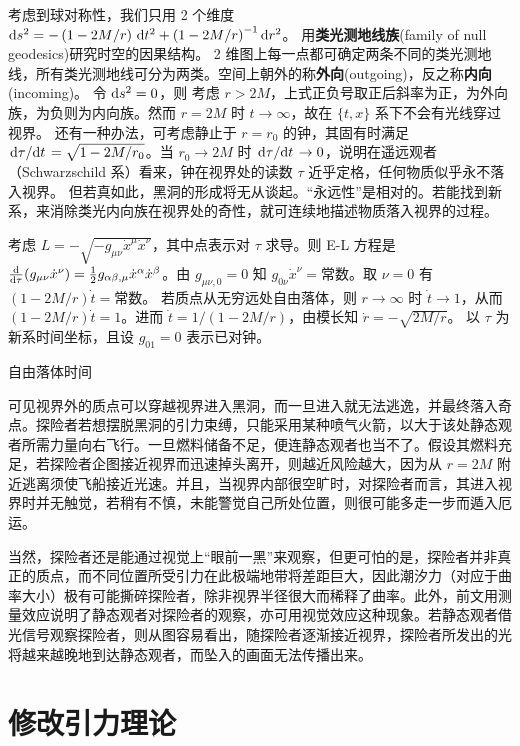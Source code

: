 考虑到球对称性，我们只用 2 个维度 $\dd s^2=-\left(1-{2M}/{r}\right)\,\text d t^2+\left(1-{2M}/{r}\right)^{-1}\text d r^2$。
用\textbf{类光测地线族}(family of null geodesics)研究时空的因果结构。
2 维图上每一点都可确定两条不同的类光测地线，所有类光测地线可分为两类。空间上朝外的称\textbf{外向}(outgoing)，反之称\textbf{内向}(incoming)。
令 $\dd s^2=0$，则
考虑 $r>2M$，上式正负号取正后斜率为正，为外向族，为负则为内向族。然而 $r=2M$ 时 $t\to\infty$，故在 $\{t,x\}$ 系下不会有光线穿过视界。
还有一种办法，可考虑静止于 $r=r_0$ 的钟，其固有时满足 $\dv*{\tau}{t}={\sqrt{1-2M/r_0}}$。当 $r_0\to 2M$ 时 $\dv*{\tau}{t}\to 0$，说明在遥远观者（Schwarzschild 系）看来，钟在视界处的读数 $\tau$ 近乎定格，任何物质似乎永不落入视界。
但若真如此，黑洞的形成将无从谈起。“永远性”是相对的。若能找到新系，来消除类光内向族在视界处的奇性，就可连续地描述物质落入视界的过程。

考虑 $L=-\sqrt{-g_{\mu\nu}\dot x^\mu\dot x^\nu}$，其中点表示对 $\tau$ 求导。则 E-L 方程是 $\dv{\tau}(g_{\mu\nu}\dot x^\nu)=\frac 12 g_{\alpha\beta,\mu}\dot x^\alpha\dot x^\beta$。由 $g_{\mu\nu,0}=0$ 知 $g_{0\nu}\dot x^\nu=\text{常数}$。取 $\nu=0$ 有 $\left(1-{2M}/{r}\right)\dot t=\text{常数}$。
若质点从无穷远处自由落体，则 $r\to\infty$ 时 $\dot t\to 1$，从而 $(1-{2M}/{r})\dot t=1$。进而 $\dot t=1/(1-{2M}/{r})$，由模长知 $\dot r=-\sqrt{2M/r}$。
以 $\tau$ 为新系时间坐标，且设 $g_{01} = 0$ 表示已对钟。

自由落体时间

可见视界外的质点可以穿越视界进入黑洞，而一旦进入就无法逃逸，并最终落入奇点。探险者若想摆脱黑洞的引力束缚，只能采用某种喷气火箭，以大于该处静态观者所需力量向右飞行。一旦燃料储备不足，便连静态观者也当不了。假设其燃料充足，若探险者企图接近视界而迅速掉头离开，则越近风险越大，因为从 $r=2M$ 附近逃离须使飞船接近光速。并且，当视界内部很空旷时，对探险者而言，其进入视界时并无触觉，若稍有不慎，未能警觉自己所处位置，则很可能多走一步而遁入厄运。

当然，探险者还是能通过视觉上“眼前一黑”来观察，但更可怕的是，探险者并非真正的质点，而不同位置所受引力在此极端地带将差距巨大，因此潮汐力（对应于曲率大小）极有可能撕碎探险者，除非视界半径很大而稀释了曲率。此外，前文用测量效应说明了静态观者对探险者的观察，亦可用视觉效应这种现象。若静态观者借光信号观察探险者，则从图容易看出，随探险者逐渐接近视界，探险者所发出的光将越来越晚地到达静态观者，而坠入的画面无法传播出来。


\section{修改引力理论}
